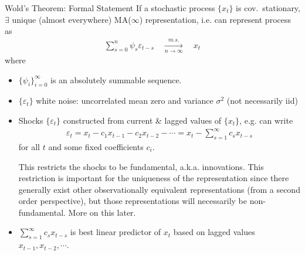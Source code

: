 \documentclass[aspectratio=169, handout]{beamer}
\newcommand{\ra}{\rightarrow}
\newcommand{\msto}{\xrightarrow{m.s.}}
\begin{document}
{\scriptsize
\begin{frame}{Wold's Theorem: Formal Statement}
If a stochastic process $\{x_t\}$ is \alert{cov.\ stationary},
\alert{$\exists$} \alert{unique} (almost everywhere) \alert{MA($\infty$)}
\alert{representation}, i.e. can represent process as
\begin{align*}
  \sum_{s=0}^n \psi_s\varepsilon_{t-s}
  \quad\underset{n\ra\infty}{\msto}\quad
  x_t
\end{align*}
where
\begin{itemize}
  \item $\{\psi_i\}_{i=0}^\infty$ is an absolutely summable
    sequence.

  \pause
  \item $\{\varepsilon_t\}$ white noise: uncorrelated mean zero and variance
    $\sigma^2$ (not necessarily iid)

  \pause
  \item Shocks $\{\varepsilon_t\}$ constructed from
    current \& lagged values of $\{x_t\}$, e.g. can write
    \begin{align*}
      \varepsilon_t = {x}_t - c_1{x}_{t-1} -
      c_2{x}_{t-2}-\cdots
      =
      x_t -
      \sum_{s=1}^\infty
      c_s x_{t-s}
    \end{align*}
    for all $t$ and some \alert{fixed} coefficients $c_i$.
    \pause

    This restricts the shocks to be \alert{fundamental}, a.k.a.
    \alert{innovations}.
    This restriction is important for the \alert{uniqueness} of the
    representation since there generally exist other observationally
    equivalent representations (from a second order perspective),
    but those representations will necessarily be
    non-fundamental.
    More on this later.



  \pause
  \item
    $\sum_{s=1}^\infty c_s x_{t-s}$
    is \alert{best linear predictor} of $x_t$ based on lagged
    values $x_{t-1},x_{t-2},\cdots$.
\end{itemize}



\end{frame}
}
\end{document}
